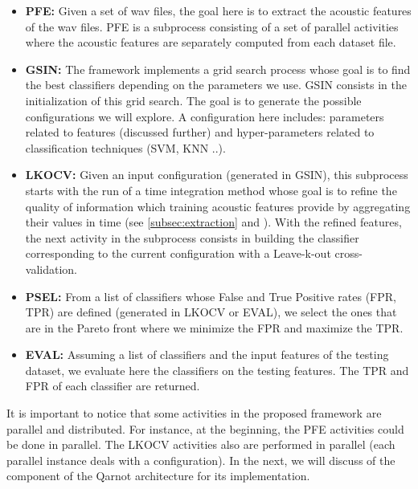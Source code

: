 \documentclass[10pt, conference, compsocconf]{IEEEtran}
\begin{document}
\begin{itemize}

\item {\bf PFE:} Given a set of wav files, the goal here is to extract the acoustic features of the wav files. PFE is a subprocess 
consisting of a set of parallel activities where the acoustic features are separately computed from each dataset file. 

\item {\bf GSIN:} The framework implements a grid search process whose goal is to find the best classifiers depending on the 
parameters we use. GSIN consists in the initialization of this grid search. The goal is to generate the possible configurations 
we will explore. A configuration here includes: parameters related to features (discussed further) and hyper-parameters related to 
classification techniques (SVM, KNN ..).

\item {\bf LKOCV:} Given an input configuration (generated in GSIN), this subprocess starts with the run of a 
  time integration method whose goal is to refine the quality of information which training acoustic features provide by aggregating their values in time (see \ref{subsec:extraction} and \cite{DBLP:journals/taslp/JoderER09}). With the refined features, the next activity 
in the subprocess consists in building the classifier corresponding to the current configuration with a Leave-k-out cross-validation.

\item {\bf PSEL:} From a list of classifiers whose False and True Positive rates (FPR, TPR) are defined (generated in LKOCV or EVAL), we select the ones that are in the Pareto front where we minimize the FPR and maximize the TPR.

\item {\bf EVAL:}  Assuming a list of classifiers and the input features of the testing dataset, we evaluate here the classifiers on the testing features. The TPR and FPR of each classifier are returned.

\end{itemize}

It is important to notice that some activities in the proposed framework are parallel and distributed. For instance, at the beginning, 
the PFE activities could be done in parallel. The LKOCV activities also are performed in parallel (each parallel instance deals  
with a configuration). In the next, we will discuss of the component of the Qarnot architecture for 
its implementation.
\end{document}
